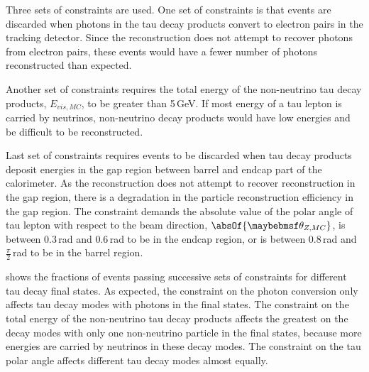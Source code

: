 Three sets of constraints are used. One set of constraints is that events are discarded when photons in the tau decay products convert to electron pairs in the tracking detector. Since the reconstruction does not attempt to recover photons from electron pairs, these events would have a fewer number of photons reconstructed than expected.




Another set of constraints requires the total energy of the non-neutrino tau decay products, $E_{vis,MC}$, to be greater than 5\,GeV. If most energy of a tau lepton is carried by  neutrinos, non-neutrino decay products would have low energies and be difficult to be reconstructed.




Last set of constraints requires events to be discarded when tau decay products deposit energies in the gap region between barrel and  endcap part of the calorimeter. As the reconstruction   does not attempt to recover reconstruction in the gap region, there is a degradation in the particle reconstruction efficiency in the gap region. The constraint demands the absolute value of the polar angle of tau lepton with respect to the beam direction, $\absOf{\theta_{Z,MC}}$, is between 0.3\,rad and 0.6\,rad to be  in the endcap region, or is between 0.8\,rad and $\frac{\pi}{2}$\,rad to be  in the barrel region.

 shows the fractions of events passing successive sets of constraints  for different tau decay final states.  As expected, the constraint on the photon conversion only affects tau decay modes with  photons in the final states. The constraint on the total energy of the non-neutrino tau decay products affects the greatest on the  decay modes with only one non-neutrino particle in the final states, because more energies are carried by neutrinos in these decay modes. The constraint on the tau polar angle affects different tau decay modes almost equally.




